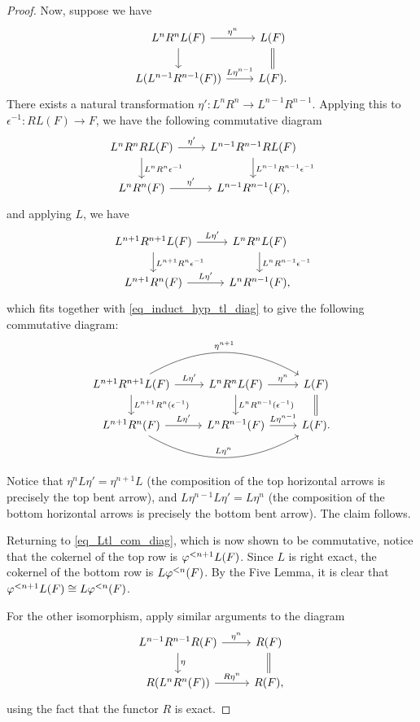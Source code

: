 \begin{proof}
Now, suppose we have
\begin{equation}\label{eq_induct_hyp_tl_diag}
\begin{tikzcd}
L^{n}R^{n}L(F) \arrow{r}{\eta^{n}} \arrow{d} &
L(F) \arrow[equals]{d} \\
L(L^{n - 1}R^{n - 1}(F)) \arrow{r}{L\eta^{n - 1}} &
L(F).
\end{tikzcd}
\end{equation}
There exists a natural transformation $\eta': L^n R^n \to 
L^{n - 1} R^{n - 1}$. Applying this to $\epsilon^{-1}: RL(F) \to 
F$, we have the following commutative diagram
\[
\begin{tikzcd}
L^n R^n RL(F) \arrow{r}{\eta'} 
   \arrow{d}{L^nR^n \epsilon^{-1}} &
L^{n - 1}R^{n - 1} RL(F) 
   \arrow{d}{L^{n - 1}R^{n - 1}\epsilon^{-1}} \\
L^nR^n(F) \arrow{r}{\eta'} &
L^{n - 1}R^{n - 1} (F),
\end{tikzcd}
\]
and applying $L$, we have
\[
\begin{tikzcd}
L^{n + 1} R^{n + 1} L(F) \arrow{r}{L\eta'} 
   \arrow{d}{L^{n + 1}R^n \epsilon^{-1}} &
L^{n}R^n L(F) \arrow{d}{L^nR^{n - 1}\epsilon^{-1}} \\
L^{n + 1}R^n(F) \arrow{r}{L\eta'} &
L^{n}R^{n - 1}(F),
\end{tikzcd}
\]
which fits together with \eqref{eq_induct_hyp_tl_diag} to give the 
following commutative diagram:
\[
\begin{tikzcd}
L^{n + 1} R^{n + 1} L(F) \arrow{r}{L\eta'} 
   \arrow{d}{L^{n + 1}R^n(\epsilon^{-1})}
   \arrow[bend left]{rr}{\eta^{n + 1}} &
L^{n}R^n L(F) \arrow{d}{L^nR^{n - 1}(\epsilon^{-1})}
   \arrow{r}{\eta^{n}} &
L(F) \arrow[equals]{d} \\
L^{n + 1}R^n(F) \arrow{r}{L\eta'} 
   \arrow[bend right]{rr}{L\eta^n} &
L^{n}R^{n - 1}(F) \arrow{r}{L\eta^{n - 1}} &
L(F).
\end{tikzcd}
\]
Notice that $\eta^n L\eta' = \eta^{n + 1}L$ (the composition of
the top horizontal arrows is precisely the top bent arrow), and
$L\eta^{n - 1}L\eta' = L\eta^n$ (the composition of the bottom
horizontal arrows is precisely the bottom bent arrow). The claim
follows.

Returning to \eqref{eq_Ltl_com_diag}, which is now shown to 
be commutative, notice that the cokernel of the top row is 
$\varphi^{< n + 1}L(F)$. Since $L$ is right exact, the cokernel of 
the bottom row is $L\varphi^{< n}(F)$. By the Five Lemma, it is clear 
that $\varphi^{< n + 1}L(F) \cong L\varphi^{< n}(F)$.

For the other isomorphism, apply similar arguments to the
diagram
\[
\begin{tikzcd}
L^{n - 1}R^{n - 1}R(F) \arrow{r}{\eta^n} 
   \arrow{d}{\eta} &
R(F) \arrow[equals]{d} \\
R (L^n R^n(F)) \arrow{r}{R \eta^n} &
R(F),
\end{tikzcd}
\]
using the fact that the functor $R$ is exact.
\end{proof}

